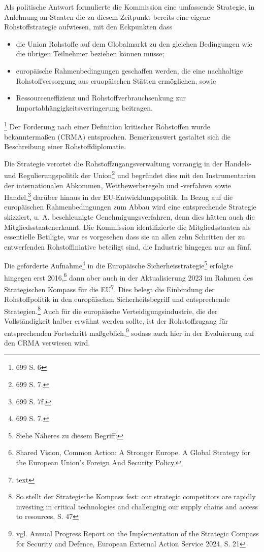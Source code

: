 \documentclass[12pt,a4paper,oneside]{book} %
\begin{document}
Als politische Antwort formulierte die Kommission eine \glqq umfassende Strategie\grqq, in Anlehnung an Staaten die zu diesem Zeitpunkt bereits eine eigene Rohstoffstrategie aufwiesen, mit den Eckpunkten dass
\begin{itemize}
	\item die Union Rohstoffe auf dem Globalmarkt zu den gleichen Bedingungen wie die übrigen Teilnehmer beziehen können müsse;
	\item europäische Rahmenbedingungen geschaffen werden, die eine nachhaltige Rohstoffversorgung aus eruopäischen Stätten ermöglichen, sowie
	\item Ressourceneffizienz und Rohstoffverbrauchsenkung zur Importabhängigkeitsverringerung 
	beitragen.
\end{itemize}
\footnote{699 S. 6}
Der Forderung nach einer Definition kritischer Rohstoffen wurde bekanntermaßen (CRMA) entsprochen. Bemerkenswert gestaltet sich die Beschreibung einer \glqq Rohstoffdiplomatie\grqq. 

Die Strategie verortet die Rohstoffzugangsverwaltung vorrangig in der Handels- und Regulierungspolitik der Union\footnote{699 S. 7.} und begründet dies mit den Instrumentarien der internationalen Abkommen, Wettbewerbsregeln und -verfahren sowie Handel,\footnote{699 S. 7f.} darüber hinaus in der EU-Entwicklungspolitik. In Bezug auf die europäischen Rahmenbedingungen zum Abbau wird eine entsprechende Strategie skizziert, u. A. beschleunigte Genehmigungsverfahren, denn dies hätten \glqq auch die Mitgliedsstaaten\grqq erkannt. Die Kommission identifizierte die Mitgliedsstaaten als essentielle Betiligte, war es vorgesehen dass sie an allen zehn Schritten der zu entwerfenden Rohstoffiniative beteiligt sind, die Industrie hingegen nur an fünf.

Die geforderte Aufnahme\footnote{699 S. 7.} in die Europäische Sicherheisstrategie\footnote{Siehe Näheres zu diesem Begriff:} erfolgte hingegen erst 2016,\footnote{Shared Vision, Common Action:
A Stronger Europe. A Global Strategy for the European Union’s Foreign And Security Policy,} dann aber auch in der Aktualisierung 2023 im Rahmen des \glqq Strategischen Kompass für die EU\grqq\footnote{text}. Dies belegt die Einbindung der Rohstoffpolitik in den europäischen Sicherheitsbegriff und entsprechende Strategien.\footnote{So stellt der Strategische Kompass fest: \glqq our strategic competitors are rapidly investing in critical technologies and challenging our supply chains and access to resources\grqq, S. 47} Auch für die europäische Verteidigungsindustrie, die der Vollständigkeit halber erwähnt werden sollte, ist der Rohstoffzugang für entsprechenden Fortschritt maßgeblich,\footnote{vgl. Annual Progress Report on the Implementation of the Strategic Compass for Security and Defence, European External Action Service 2024, S. 21} sodass auch hier in der Evaluierung auf den CRMA verwiesen wird.
\end{document}
